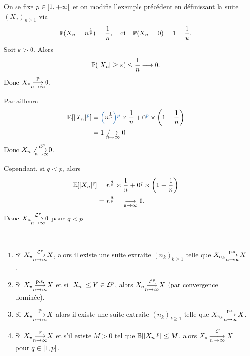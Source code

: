 \begin{example}
    On se fixe \(p \in \mathopen{}\left[1, +\infty\right[\mathclose{}\) et on modifie
    l'exemple précédent en définissant la suite \({(X_n)}_{n\geq 1}\)
    via
    \begin{equation*}
        \mathbb{P}(X_n = n^{\frac{1}{p}}) = \frac{1}{n},\quad\text{et}\quad \mathbb{P}(X_n = 0) = 1 - \frac{1}{n}.
    \end{equation*}
    Soit \(\varepsilon > 0\). Alors
    \begin{equation*}
        \mathbb{P}(\mathopen{}\left|X_n\right|\mathclose{} \geq \varepsilon)
        \leq \frac{1}{n} \longrightarrow 0.
    \end{equation*}
    Donc \(X_n \underset{n\to\infty}{{\overset{\mathbb{P}}{\longrightarrow}}} 0\).

    Par ailleurs
    \begin{equation*}
        \begin{aligned}
            \bb E[\n{X_n}^{\color{astral}p\color{black}}] 
            &= {\color{astral}\left(\color{black}n^{\frac{1}{p}}\color{astral}\right)\color{black}}^{\color{astral}p\color{black}} \times \frac{1}{n} + 0^{\color{astral}p\color{black}} \times \left(1 - \frac{1}{n}\right)\\
            &= 1 \not\cvn 0
        \end{aligned}
    \end{equation*}
    Donc \(X_n \not\underset{n\to\infty}{{\overset{\mathcal{L}^{p}}{\longrightarrow}}} 0\).

    Cependant, si \(q<p\), alors
    \begin{equation*}
        \begin{aligned}
            \mathbb{E}[\mathopen{}\left|X_n\right|\mathclose{}^q] 
            &= n^{\frac{q}{p}} \times \frac{1}{n} + 0^q \times \left(1 - \frac{1}{n}\right)\\
            &= n^{\frac{q}{p} - 1} \underset{n\to\infty}{\longrightarrow} 0.
        \end{aligned}
    \end{equation*}
    Donc \(X_n \underset{n\to\infty}{{\overset{\mathcal{L}^{p}}{\longrightarrow}}} 0\) pour \(q < p\).
\end{example}

\begin{remark}\,\\
    \begin{enumerate}
        \item Si \(X_n \underset{n\to\infty}{{\overset{\mathcal{L}^{p}}{\longrightarrow}}} X\), alors il existe une suite
        extraite \({(n_k)}_{k\geq 1}\) telle que \(X_{n_k} \underset{n\to\infty}{{\overset{\text{p.s.}}{\longrightarrow}}} X\).

        \item Si \(X_n \underset{n\to\infty}{{\overset{\text{p.s.}}{\longrightarrow}}} X\) et si \(\mathopen{}\left|X_n\right|\mathclose{} \leq Y\in \mathcal L^p\),
        alors \(X_n \underset{n\to\infty}{{\overset{\mathcal{L}^{p}}{\longrightarrow}}} X\) (par convergence dominée).

        \item Si \(X_n \underset{n\to\infty}{{\overset{\mathbb{P}}{\longrightarrow}}} X\) alors il existe une suite
        extraite \({(n_k)}_{k\geq 1}\) telle que \(X_{n_k} \underset{n\to\infty}{{\overset{\text{p.s.}}{\longrightarrow}}} X\).

        \item Si \(X_n \underset{n\to\infty}{{\overset{\mathbb{P}}{\longrightarrow}}} X\) et s'il existe \(M>0\) tel
        que \(\mathbb{E}[\mathopen{}\left|X_n\right|\mathclose{}^p] \leq M\), alors 
        \(X_n \underset{n\to\infty}{\overset{\mathcal{L}^{q}}{\longrightarrow}} X\)
        pour \(q \in \mathopen{}\left[1, p\right[\mathclose{}\).
    \end{enumerate}
\end{remark}


